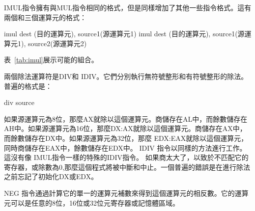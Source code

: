 {\code IMUL}指令擁有與{\code MUL}指令相同的格式，但是同樣增加了其他一些指令格式。這有兩個和三個運算元的格式：
\begin{AsmCodeListing}[numbers=none,frame=none]
      imul   dest (目的運算元), source1(源運算元1)
      imul   dest (目的運算元), source1(源運算元1), source2(源運算元2)
\end{AsmCodeListing}
表~\ref{tab:imul}展示可能的組合。
  

  兩個除法運算符是{\code DIV}和{\code
IDIV}。它們分別執行無符號整形和有符號整形的除法。普遍的格式是：
\begin{AsmCodeListing}[numbers=none,frame=none]
      div   source
\end{AsmCodeListing}
如果源運算元為8位，那麼AX就除以這個運算元。商儲存在AL中，而餘數儲存在AH中。如果源運算元為16位，那麼DX:AX就除以這個運算元。商儲存在AX中，而餘數儲存在DX中。如果源運算元為32位，那麼
EDX:EAX就除以這個運算元，同時商儲存在EAX中，餘數儲存在EDX中。{\code
IDIV} 指令以同樣的方法進行工作。這沒有像{\code
IMUL}指令一樣的特殊的{\code IDIV}指令。
如果商太大了，以致於不匹配它的寄存器，或除數為0,那麼這個程式將被中斷和中止。一個普遍的錯誤是在進行除法之前忘記了初始化DX或EDX。

{\code NEG} 指令通過計算它的單一的運算元補數來得到這個運算元的相反數。它的運算元可以是任意的8位，16位或32位元寄存器或記憶體區域。

